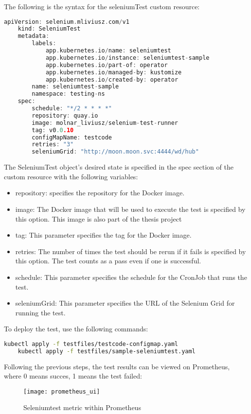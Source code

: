 The following is the syntax for the seleniumTest custom resource:
\begin{lstlisting}[language={Go}]
	apiVersion: selenium.mliviusz.com/v1
	kind: SeleniumTest
	metadata:
		labels:
			app.kubernetes.io/name: seleniumtest
			app.kubernetes.io/instance: seleniumtest-sample
			app.kubernetes.io/part-of: operator
			app.kubernetes.io/managed-by: kustomize
			app.kubernetes.io/created-by: operator
		name: seleniumtest-sample
		namespace: testing-ns
	spec:
		schedule: "*/2 * * * *"
		repository: quay.io
		image: molnar_liviusz/selenium-test-runner
		tag: v0.0.10
		configMapName: testcode
		retries: "3"
		seleniumGrid: "http://moon.moon.svc:4444/wd/hub"
\end{lstlisting}

The SeleniumTest object's desired state is specified in the spec section of the custom resource with the following variables:

\begin{itemize}
	\item repository: specifies the repository for the Docker image.
	\item image: The Docker image that will be used to execute the test is specified by this option. This image is also part of the thesis project
	\item tag: This parameter specifies the tag for the Docker image.
	\item retries: The number of times the test should be rerun if it fails is specified by this option. The test counts as a pass even if one is successful.
	\item schedule: This parameter specifies the schedule for the CronJob that runs the test.
	\item seleniumGrid: This parameter specifies the URL of the Selenium Grid for running the test.
\end{itemize}

To deploy the test, use the following commands:
\begin{lstlisting}[language=bash]
	kubectl apply -f testfiles/testcode-configmap.yaml
	kubectl apply -f testfiles/sample-seleniumtest.yaml
\end{lstlisting}

Following the previous steps, the test results can be viewed on Prometheus, where 0 means succes, 1 means the test failed:
\begin{figure}[H]
	\centering
	\texttt{[image: prometheus\_ui]}
	\label{fig:prometheus_ui}
	\caption{Seleniumtest metric within Prometheus}
\end{figure}